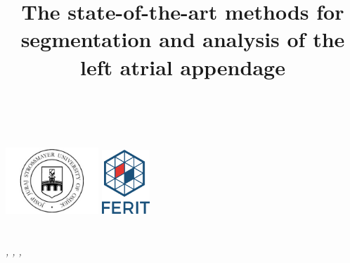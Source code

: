 	\begin{titlepage}
\begin{center}

\textsc{\LARGE \bfseries \uni}\\[0.5cm]
\textsc{\Large \bfseries \faculty}\\[1.5cm]
\includegraphics[width=3.5cm]{gfx/unios.png} 
\includegraphics[width=1.8cm]{gfx/ferit.png}
\\[2.0cm]

\textsc{\Large \bfseries \documentType}\\[2.5cm]	
{\Large \bfseries \documentTitle}\\[2.5cm]


    \textsc{\itshape%
      \firstAuthor, 
        \secondAuthor, 
        \thirdAuthor,
        \fourthAuthor
    }\\[0.3cm]

\vfill

{\large \documentLocation \documentDate}

\end{center}

\end{titlepage}


\newpage\null\thispagestyle{empty}\newpage

\thispagestyle{fancy}
\title{ \bfseries The state-of-the-art methods for segmentation and analysis of the left atrial appendage}
\author{}
\date{ }
\maketitle

